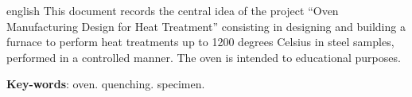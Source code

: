 \begin{resumo}[Abstract]
 \begin{otherlanguage*}{english}
   This document records the central idea of the project “Oven Manufacturing Design for Heat Treatment” consisting in designing and building a furnace to perform heat treatments up to 1200 degrees Celsius in steel samples, performed in a controlled manner. The oven is intended to educational purposes.

   \vspace{\onelineskip}
 
   \noindent 
   \textbf{Key-words}: oven. quenching. specimen.
 \end{otherlanguage*}
\end{resumo}
